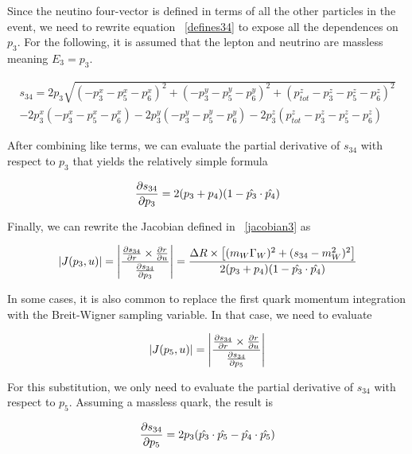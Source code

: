 Since the neutino four-vector is defined in terms of all the other particles in
the event, we need to rewrite equation ~\ref{defines34} to expose all the
dependences on $p_{3}$. For the following, it is assumed that the lepton and
neutrino are massless meaning $E_{3} = p_{3}$. 

\begin{eqnarray}
\label{defines34_2}
\nonumber
s_{34} = 2p_{3}\sqrt{(-p_{3}^{x} -p_{5}^{x} -p_{6}^{x})^{2} + (-p_{3}^{y} -p_{5}^{y} -p_{6}^{y})^{2} + (p_{tot}^{z} -p_{3}^{z} -p_{5}^{z} -p_{6}^{z})^{2}} \\
- 2p_{3}^{x}(-p_{3}^{x} -p_{5}^{x} -p_{6}^{x}) -
2p_{3}^{y}(-p_{3}^{y} -p_{5}^{y} -p_{6}^{y}) - 2p_{3}^{z}(p_{tot}^{z} -p_{3}^{z} -p_{5}^{z} -p_{6}^{z})
\end{eqnarray}

After combining like terms, we can evaluate the partial derivative of $s_{34}$
with respect to $p_{3}$ that yields the relatively
simple formula

\begin{equation}
\label{ds34dp3}
\frac{\partial s_{34}}{\partial p_{3}} = 2(p_{3} + p_{4})(1 - \hat{p_{3}} \cdot \hat{p_{4}})
\end{equation}

Finally, we can rewrite the Jacobian defined in ~\ref{jacobian3} as

\begin{equation}
\label{jacobian4}
|J(p_{3}, u)| = \left | \frac{\frac{\partial s_{34}}{\partial r} \times
\frac{\partial r}{\partial u}}{\frac{\partial s_{34}}{\partial p_{3}}} \right | = \frac{\Delta R \times \left[
(m_{W}\Gamma_{W})^{2} + (s_{34} - m_{W}^{2})^{2} \right]}{2(p_{3} + p_{4})(1 - \hat{p_{3}} \cdot \hat{p_{4}})}
\end{equation}

In some cases, it is also common to replace the first quark momentum integration
with the Breit-Wigner sampling variable. In that case, we need to evaluate

\begin{equation}
\label{jacobian_5}
|J(p_{5}, u)| = \left | \frac{\frac{\partial s_{34}}{\partial r} \times
\frac{\partial r}{\partial u}}{\frac{\partial s_{34}}{\partial p_{5}}} \right |
\end{equation}

For this substitution, we only need to evaluate the partial derivative of
$s_{34}$ with respect to $p_{5}$. Assuming a massless quark, the result is

\begin{equation}
\label{ds34dp5}
\frac{\partial s_{34}}{\partial p_{5}} = 2p_{3}(\hat{p_{3}} \cdot \hat{p_{5}} - \hat{p_{4}} \cdot \hat{p_{5}})
\end{equation}

